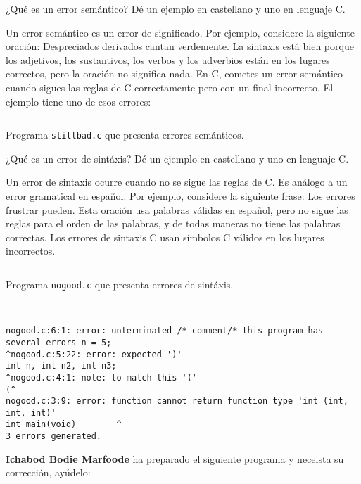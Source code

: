 \documentclass[spanish,addpoints,answers,a4paper]{exam}
\begin{document}
\begin{questions}
\question ¿Qué es un error semántico? Dé un ejemplo en castellano y uno en lenguaje C.

\begin{solution}
Un error semántico es un error de significado. Por ejemplo, considere la siguiente oración: Despreciados derivados cantan verdemente. La sintaxis está bien porque los adjetivos, los sustantivos, los verbos y los adverbios están en los lugares correctos, pero la oración no significa nada. En C, cometes un error semántico cuando sigues las reglas de C correctamente pero con un final incorrecto. El ejemplo tiene uno de esos errores:

\begin{listing}[H]
\footnotesize
\inputminted{c}{exercise1.c}
\caption{Programa \texttt{stillbad.c} que presenta errores semánticos.}
\label{lst:1}
\end{listing}

\end{solution}

\question ¿Qué es un error de sintáxis? Dé un ejemplo en castellano y uno en lenguaje C.

\begin{solution}
Un error de sintaxis ocurre cuando no se sigue las reglas de C. Es análogo a un error gramatical en español. Por ejemplo, considere la siguiente frase: Los errores frustrar pueden. Esta oración usa palabras válidas en español, pero no sigue las reglas para el orden de las palabras, y de todas maneras no tiene las palabras correctas. Los errores de sintaxis C usan símbolos C válidos en los lugares incorrectos.

\begin{listing}[H]
\footnotesize
\inputminted{c}{exercise2.c}
\caption{Programa \texttt{nogood.c} que presenta errores de sintáxis.}
\label{lst:2}
\end{listing}
\
{\footnotesize
\begin{verbatim}
nogood.c:6:1: error: unterminated /* comment/* this program has several errors n = 5;
^nogood.c:5:22: error: expected ')'
int n, int n2, int n3;
^nogood.c:4:1: note: to match this '('
(^
nogood.c:3:9: error: function cannot return function type 'int (int, int, int)'
int main(void)        ^
3 errors generated.
\end{verbatim}
}
\end{solution}

\question \textbf{Ichabod Bodie Marfoode} ha preparado el siguiente programa y neceista su corrección, ayúdelo:


\end{questions}
\end{document}
